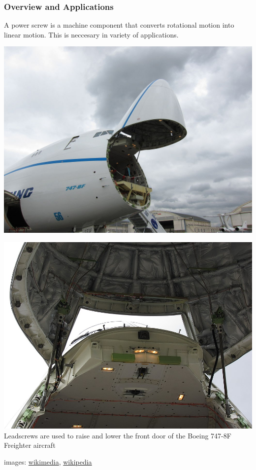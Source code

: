 \documentclass[fleqn]{beamer} %
\newcommand{\sectiontitleI}{Overview and Applications}
\begin{document}
	\begin{frame}[label=sectionI] \small
		\frametitle{\sectiontitleI}	

		\begin{multicols}{2}
			A power screw is a machine component that converts rotational motion into linear motion. This is neccesary in variety of applications. 

			\includegraphics[scale=0.135]{images/1024px-Nose_cargo_door_of_Boeing_747-8F.jpg}

			\includegraphics[scale=.175]{images/960px-Detail_of_raised_nose_cargo_door_of_Boeing_747-8F.jpeg}
			\tiny{Leadscrews are used to raise and lower the front door of the Boeing 747-8F Freighter aircraft}
		\end{multicols}

		{\tiny images: \href{https://en.m.wikipedia.org/wiki/File:Nose_cargo_door_of_Boeing_747-8F.jpg}{wikimedia}, \href{https://en.wikipedia.org/wiki/Leadscrew}{wikipedia} }

	\end{frame}
\end{document}

